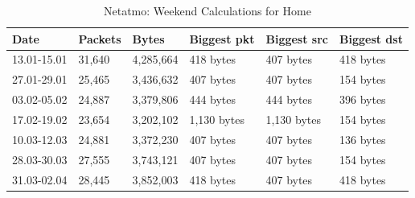 \begin{table}[H]
    \caption{Netatmo: Weekend Calculations for Home}
    \begin{tabular}{|l|l|l|l|l|l|}
    \hline
        \textbf{Date}    & \textbf{Packets} & \textbf{Bytes} & \textbf{Biggest pkt} &     \textbf{Biggest src} & \textbf{Biggest dst} \\ \hline
        13.01-15.01      & 31,640                 & 4,285,664              & 418 bytes              & 407 bytes                   & 418 bytes                            \\ \hline
        27.01-29.01      & 25,465                 & 3,436,632              & 407 bytes              & 407 bytes                    & 154 bytes                           \\ \hline
        03.02-05.02      & 24,887                 & 3,379,806              & 444 bytes              & 444 bytes                     & 396 bytes                           \\ \hline
        17.02-19.02      & 23,654                 & 3,202,102              & 1,130 bytes            & 1,130 bytes             & 154 bytes                         \\ \hline
        10.03-12.03      & 24,881                 & 3,372,230              & 407 bytes              & 407 bytes                    & 136 bytes                           \\ \hline
        28.03-30.03      & 27,555                 & 3,743,121              & 407 bytes              & 407 bytes                    & 154 bytes                           \\ \hline
        31.03-02.04      & 28,445                 & 3,852,003              & 418 bytes              & 407 bytes                    & 418 bytes                           \\ \hline
    \end{tabular}
    \label{tab:NetatmoHomeWeekends}
\end{table}

